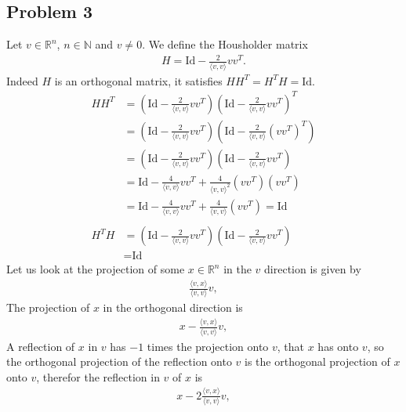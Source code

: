 \subsection{Problem 3}
Let $v \in \mathbb{R}^n$, $n \in \mathbb{N}$ and $v \neq 0$. We define the Housholder
matrix
\begin{align}
    H = \text{Id} - \frac{2}{\langle v, v \rangle}v v^T.
\end{align}
Indeed $H$ is an orthogonal matrix, it satisfies $H H^T = H^T H = \text{Id}$.
\begin{align}
    H H^T
    &=
    \left( \text{Id} - \frac{2}{\langle v, v \rangle}vv^T\right)
    \left( \text{Id} - \frac{2}{\langle v, v \rangle}vv^T\right)^T\\
    &=
    \left( \text{Id} - \frac{2}{\langle v, v \rangle}vv^T\right)
    \left( \text{Id} - \frac{2}{\langle v, v \rangle}(vv^T)^T\right)\\
    &=
    \left( \text{Id} - \frac{2}{\langle v, v \rangle}vv^T\right)
    \left( \text{Id} - \frac{2}{\langle v, v \rangle}vv^T\right)\\
    &= \text{Id} - \frac{4}{\langle v, v \rangle} vv^T + \frac{4}{\langle v,
    v \rangle^2} (v v^T)(v v^T)\\
    &= \text{Id} - \frac{4}{\langle v, v \rangle} vv^T + \frac{4}{\langle v,
    v \rangle} (v v^T) = \text{Id}
    \\
    \nonumber\\
    H^T H &=
    \left( \text{Id} - \frac{2}{\langle v, v \rangle}vv^T\right)
    \left( \text{Id} - \frac{2}{\langle v, v \rangle}vv^T\right)\\
          &= \text{Id}
\end{align}
Let us look at the projection of some $x \in \mathbb{R}^n$ in the $v$
direction is given by
\begin{align}
   \frac{\langle v,  x \rangle}{\langle v, v \rangle} v,
\end{align}
The projection of $x$ in the orthogonal direction is
\begin{align}
    x - \frac{\langle v,  x \rangle}{\langle v, v \rangle} v,
\end{align}
A reflection of $x$ in $v$ has $-1$ times the projection onto $v$, that $x$
has onto $v$, so the orthogonal projection of the reflection onto $v$ is the
orthogonal projection of $x$ onto $v$, therefor the reflection in $v$ of $x$
is
\begin{align}
   x - 2\frac{\langle v,  x \rangle}{\langle v, v \rangle} v,
\end{align}
